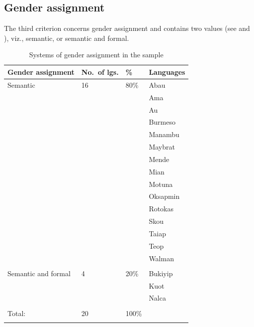 \documentclass[output=collectionpaper]{langsci/langscibook}
\begin{document}
\subsection{Gender assignment}
\label{sec:Svard:3.3}

The third criterion concerns gender assignment and contains two values (see  and ), viz., semantic, or semantic and formal.



\begin{table}[p]
\small
\begin{tabularx}{\textwidth}{lYYl}
\lsptoprule

Gender assignment & No.\ of lgs. & \% & Languages\\
\midrule
Semantic & 16 & 80\% & {Abau}\\
&&&{Ama}                        \\
&&&{Au}                         \\
&&&{Burmeso}                    \\
&&&{Manambu}                    \\
&&&{Maybrat}                    \\
&&&{Mende}                      \\
&&&{Mian}                       \\
&&&{Motuna}                     \\
&&&{Oksapmin}                   \\
&&&{Rotokas}                    \\
&&&{Skou}                       \\
&&&{Taiap}                      \\
&&&{Teop}                       \\
&&&{Walman}                     \\
&&&\\
Semantic and formal & 4 & 20\% & {Bukiyip}   \\
&&&{Kuot}\\
&&&{Nalca}\\
&&&\\
\midrule
Total: & 20 & 100\% & \\
\lspbottomrule
\end{tabularx}

\caption{Systems of gender assignment in the sample}
\label{tab:Svard:4}
\end{table}
\end{document}
